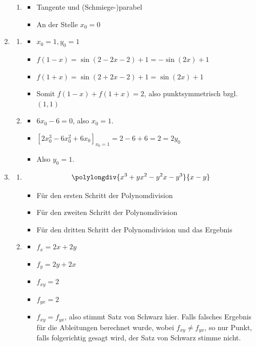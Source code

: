 \documentclass[12pt]{article}
\begin{document}
\begin{enumerate}
\begin{enumerate}
\item
\begin{itemize}
\item Tangente und (Schmiege-)parabel
\item An der Stelle $x_0=0$
\end{itemize}

\end{enumerate}

\item
\begin{enumerate}

\item 
\begin{itemize}
\item $x_0=1, y_0=1$
\item $f(1-x) = \sin(2-2x-2)+1=-\sin(2x) + 1$
\item $f(1+x) = \sin(2+2x-2)+1=\sin(2x) + 1$
\item Somit $f(1-x)+f(1+x)=2$, also punktsymmetrisch bzgl. $(1,1)$
\end{itemize}

\item 
\begin{itemize}
\item $6x_0-6=0$, also $x_0=1$.
\item $[2x_0^3-6x_0^2+6x_0]_{x_0=1}=2-6+6=2=2y_0$
\item Also $y_0 = 1$.
\end{itemize}

\end{enumerate}


\item
\begin{enumerate}

\item
\[\polylongdiv{x^3+yx^2-y^2x-y^3}{x-y}\]
\begin{itemize}
\item Für den ersten Schritt der Polynomdivision
\item Für den zweiten Schritt der Polynomdivision
\item Für den dritten Schritt der Polynomdivision und das Ergebnis
\end{itemize}

\item 
\begin{itemize}
\item $f_x = 2x+2y$
\item $f_y = 2y+2x$
\item $f_{xy} = 2$
\item $f_{yx} = 2$
\item $f_{xy} = f_{yx}$, also stimmt Satz von Schwarz hier. Falls falsches Ergebnis für die Ableitungen berechnet wurde, wobei $f_{xy} \neq f_{yx}$, so nur Punkt, falls folgerichtig gesagt wird, der Satz von Schwarz stimme nicht.
\end{itemize}


\end{enumerate}
\end{enumerate}
\end{document}

